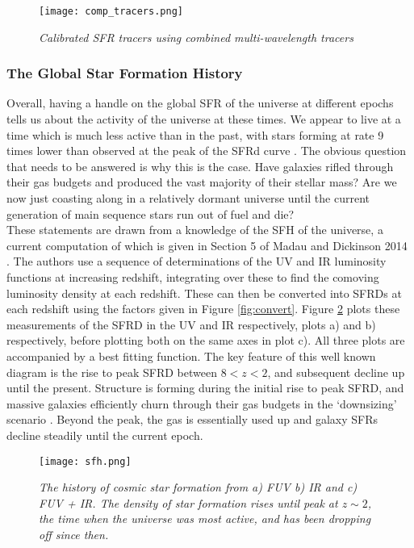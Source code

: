 \documentclass{literature}
\begin{document}
\begin{figure}[!htp]
\centering
\texttt{[image: comp\_tracers.png]}
\caption{\footnotesize{\emph{Calibrated SFR tracers using combined multi-wavelength tracers}}}
\label{fig:comp_convert}
\end{figure} 


\subsubsection{The Global Star Formation History}\label{subsubsec:gsfh}
Overall, having a handle on the global SFR of the universe at different epochs tells us about the activity of the universe at these times. We appear to live at a time which is much less active than in the past, with stars forming at rate 9 times lower than observed at the peak of the SFRd curve \citep{Madau_2014}. The obvious question that needs to be answered is why this is the case. Have galaxies rifled through their gas budgets and produced the vast majority of their stellar mass? Are we now just coasting along in a relatively dormant universe until the current generation of main sequence stars run out of fuel and die? \\ 

These statements are drawn from a knowledge of the SFH of the universe, a current computation of which is given in Section 5 of Madau and Dickinson 2014 \citep{Madau_2014}. The authors use a sequence of determinations of the UV and IR luminosity functions at increasing redshift, integrating over these to find the comoving luminosity density at each redshift. These can then be converted into SFRDs at each redshift using the factors given in Figure \ref{fig:convert}. Figure \ref{fig:sfh} plots these measurements of the SFRD in the UV and IR respectively, plots a) and b) respectively, before plotting both on the same axes in plot c). All three plots are accompanied by a best fitting function. The key feature of this well known diagram is the rise to peak SFRD between $8 < z < 2$, and subsequent decline up until the present. Structure is forming during the initial rise to peak SFRD, and massive galaxies efficiently churn through their gas budgets in the `downsizing' scenario \citep{Brooks2007}. Beyond the peak, the gas is essentially used up and galaxy SFRs decline steadily until the current epoch. \\ 

\begin{figure}[!htp]
\centering
\texttt{[image: sfh.png]}
\caption{\footnotesize{\emph{The history of cosmic star formation from a) FUV b) IR and c) FUV + IR. The density of star formation rises until peak at $z\sim 2$, the time when the universe was most active, and has been dropping off since then.}}}
\label{fig:sfh}
\end{figure} 
\end{document}
